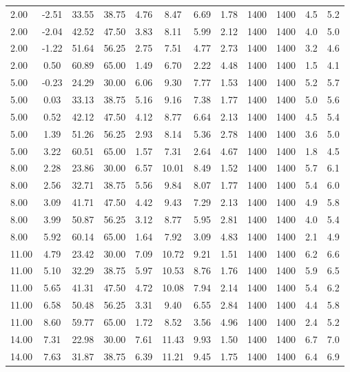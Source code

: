 \documentclass[english]{SPFShortReport}
\begin{document}
\begin{table}[!ht]
\begin{small}
\begin{center}
{\begin{tabular}{l | c c c c c c c c c c c }
2.00 & -2.51 & 33.55 & 38.75 & 4.76 & 8.47 & 6.69 & 1.78 & 1400 & 1400 & 4.5 & 5.2\\ 
2.00 & -2.04 & 42.52 & 47.50 & 3.83 & 8.11 & 5.99 & 2.12 & 1400 & 1400 & 4.0 & 5.0\\ 
2.00 & -1.22 & 51.64 & 56.25 & 2.75 & 7.51 & 4.77 & 2.73 & 1400 & 1400 & 3.2 & 4.6\\ 
2.00 & 0.50 & 60.89 & 65.00 & 1.49 & 6.70 & 2.22 & 4.48 & 1400 & 1400 & 1.5 & 4.1\\ 
5.00 & -0.23 & 24.29 & 30.00 & 6.06 & 9.30 & 7.77 & 1.53 & 1400 & 1400 & 5.2 & 5.7\\ 
5.00 & 0.03 & 33.13 & 38.75 & 5.16 & 9.16 & 7.38 & 1.77 & 1400 & 1400 & 5.0 & 5.6\\ 
5.00 & 0.52 & 42.12 & 47.50 & 4.12 & 8.77 & 6.64 & 2.13 & 1400 & 1400 & 4.5 & 5.4\\ 
5.00 & 1.39 & 51.26 & 56.25 & 2.93 & 8.14 & 5.36 & 2.78 & 1400 & 1400 & 3.6 & 5.0\\ 
5.00 & 3.22 & 60.51 & 65.00 & 1.57 & 7.31 & 2.64 & 4.67 & 1400 & 1400 & 1.8 & 4.5\\ 
8.00 & 2.28 & 23.86 & 30.00 & 6.57 & 10.01 & 8.49 & 1.52 & 1400 & 1400 & 5.7 & 6.1\\ 
8.00 & 2.56 & 32.71 & 38.75 & 5.56 & 9.84 & 8.07 & 1.77 & 1400 & 1400 & 5.4 & 6.0\\ 
8.00 & 3.09 & 41.71 & 47.50 & 4.42 & 9.43 & 7.29 & 2.13 & 1400 & 1400 & 4.9 & 5.8\\ 
8.00 & 3.99 & 50.87 & 56.25 & 3.12 & 8.77 & 5.95 & 2.81 & 1400 & 1400 & 4.0 & 5.4\\ 
8.00 & 5.92 & 60.14 & 65.00 & 1.64 & 7.92 & 3.09 & 4.83 & 1400 & 1400 & 2.1 & 4.9\\ 
11.00 & 4.79 & 23.42 & 30.00 & 7.09 & 10.72 & 9.21 & 1.51 & 1400 & 1400 & 6.2 & 6.6\\ 
11.00 & 5.10 & 32.29 & 38.75 & 5.97 & 10.53 & 8.76 & 1.76 & 1400 & 1400 & 5.9 & 6.5\\ 
11.00 & 5.65 & 41.31 & 47.50 & 4.72 & 10.08 & 7.94 & 2.14 & 1400 & 1400 & 5.4 & 6.2\\ 
11.00 & 6.58 & 50.48 & 56.25 & 3.31 & 9.40 & 6.55 & 2.84 & 1400 & 1400 & 4.4 & 5.8\\ 
11.00 & 8.60 & 59.77 & 65.00 & 1.72 & 8.52 & 3.56 & 4.96 & 1400 & 1400 & 2.4 & 5.2\\ 
14.00 & 7.31 & 22.98 & 30.00 & 7.61 & 11.43 & 9.93 & 1.50 & 1400 & 1400 & 6.7 & 7.0\\ 
14.00 & 7.63 & 31.87 & 38.75 & 6.39 & 11.21 & 9.45 & 1.75 & 1400 & 1400 & 6.4 & 6.9\\ 

\end{tabular}}
\end{center}
\end{small}
\end{table}
\end{document}

